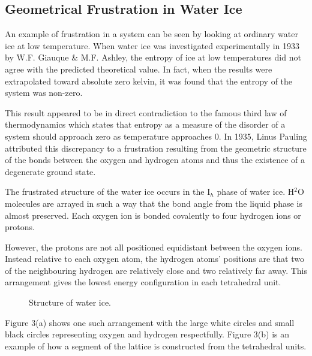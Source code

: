 \subsection{Geometrical Frustration in Water Ice}
An example of frustration in a system can be seen by looking at ordinary water ice at low temperature. When water ice was investigated experimentally in 1933 by W.F. Giauque \& M.F. Ashley, the entropy of ice at low temperatures did not agree with the predicted theoretical value. In fact, when the results were extrapolated toward absolute zero kelvin, it was found that the entropy of the system was non-zero.{\cite{b5}}
\par
This result appeared to be in direct contradiction to the famous third law of thermodynamics which states that entropy as a measure of the disorder of a system should approach zero as temperature approaches 0.  In 1935, Linus Pauling attributed this discrepancy to a frustration resulting from the geometric structure of the bonds between the oxygen and hydrogen atoms and thus the existence of a degenerate ground state.{\cite{b6}}
\par
The frustrated structure of the water ice occurs in the I$_{h}$ phase of water ice.{\cite{b7}}  H$^{2}$O molecules are arrayed in such a way that the bond angle from the liquid phase is almost preserved. Each oxygen ion is bonded covalently to four hydrogen ions or protons.
\par
However, the protons are not all positioned equidistant between the oxygen ions. Instead relative to each oxygen atom, the hydrogen atoms' positions are that two of the neighbouring hydrogen are relatively close and two relatively far away.  This arrangement gives the lowest energy configuration in each tetrahedral unit.
\par
\begin{figure}[ht!]
    \begin{center}
\qquad
        \caption{Structure of water ice.}
        \label{fig:gf2}
    \end{center}
\end{figure}
Figure 3(a) shows one such arrangement with the large white circles and small black circles representing oxygen and hydrogen respectfully.  Figure 3(b) is an example of how a segment of the lattice is constructed from the tetrahedral units.
